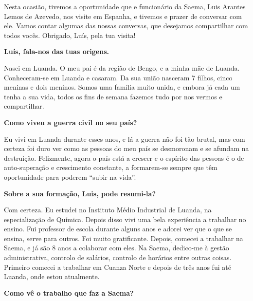 \cappar Nesta ocasião, tivemos a oportunidade que e funcionário da
Saema, Luis Arantes Lemos de Azevedo, nos visite em Espanha, e tivemos
e prazer de conversar com ele. Vamos contar algumas das nossas
conversas, que desejamos compartilhar com todos vocês. Obrigado, Luís,
pela tua visita!  \vspace{2cm}

{\bf Luís, fala-nos das tuas origens.}

\vspace{10pt}

Nasci em Luanda. O meu pai é da região de Bengo, e a minha mãe de
Luanda. Conheceram-se em Luanda e casaram. Da sua união nasceram 7
filhos, cinco meninas e dois meninos. Somos uma família muito unida, e
embora já cada um tenha a sua vida, todos os fins de semana fazemos
tudo por nos vermos e compartilhar.

\vspace{10pt}

{\bf Como viveu a guerra civil no seu país?}

\vspace{10pt}

Eu vivi em Luanda durante esses anos, e lá a guerra não foi tão
brutal, mas com certeza foi duro ver como as pessoas do meu país se
desmoronam e se afundam na destruição. Felizmente, agora o país está a
crescer e o espírito das pessoas é o de auto-superação e crescimento
constante, a formarem-se sempre que têm oportunidade para poderem
“subir na vida”.

\vspace{10pt}

{\bf Sobre a sua formação, Luis, pode resumi-la?}

\vspace{10pt}

Com certeza. Eu estudei no Instituto Médio Industrial de Luanda, na
especialização de Química. Depois disso vivi uma bela experiência a
trabalhar no ensino. Fui professor de escola durante alguns anos e
adorei ver que o que se ensina, serve para outros. Foi muito
gratificante. Depois, comecei a trabalhar na Saema, e já são 8 anos a
colaborar com eles. Na Saema, dedico-me à gestão administrativa,
controlo de salários, controlo de horários entre outras
coisas. Primeiro comecei a trabalhar em Cuanza Norte e depois de três
anos fui até Luanda, onde estou atualmente.

\vspace{10pt}

{\bf Como vê o trabalho que faz a Saema?}

